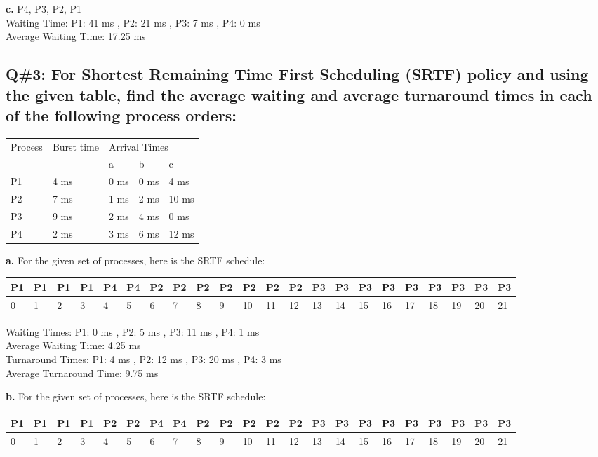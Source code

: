 \textbf{c.} P4, P3, P2, P1  \\
Waiting Time: P1: 41 ms , P2: 21 ms , P3: 7 ms , P4: 0 ms  \\
Average Waiting Time: 17.25 ms

\subsection*{Q\#3: For Shortest Remaining Time First Scheduling (SRTF) policy and using the given table, find the  
average waiting and average turnaround times in each of the following process orders:}

\begin{tabular}{lllll}
Process & Burst time & \multicolumn{3}{l}{Arrival Times} \\
& & a & b & c \\
P1 & 4 ms & 0 ms & 0 ms & 4 ms \\
P2 & 7 ms & 1 ms & 2 ms & 10 ms \\
P3 & 9 ms & 2 ms & 4 ms & 0 ms \\
P4 & 2 ms & 3 ms & 6 ms & 12 ms \\
\end{tabular}

\textbf{a.} For the given set of processes, here is the SRTF schedule:

\begin{table}[htbp]
\begin{tabularx}{\textwidth}{| X | X | X | X | X | X | X | X | X | X | X | X | X | X | X | X | X | X |X | X | X | X |}
\hline
P1&P1& P1 &P1 &P4 &P4 &P2 &P2 &P2 &P2 &P2 &P2 &P2 &P3 &P3 &P3 &P3 &P3 &P3 &P3 &P3 &P3\\
\hline
0 & 1 & 2 & 3 & 4 & 5 & 6 & 7 & 8 & 9 &10 &11 &12 &13 &14 &15 &16 &17 &18 &19 &20 &21\\
\hline
\end{tabularx}
\end{table}
Waiting Times: P1: 0 ms , P2: 5 ms , P3: 11 ms , P4: 1 ms  \\
Average Waiting Time: 4.25 ms  \\
Turnaround Times: P1: 4 ms , P2: 12 ms , P3: 20 ms , P4: 3 ms  \\
Average Turnaround Time: 9.75 ms

\textbf{b.} For the given set of processes, here is the SRTF schedule:

\begin{table}[htbp]
\begin{tabularx}{\textwidth}{| X | X | X | X | X | X | X | X | X | X | X | X | X | X | X | X | X | X |X | X | X | X |}
\hline
P1 & P1 & P1 & P1 & P2 & P2 & P4 & P4 & P2 & P2 & P2 & P2 & P2 & P3 & P3 & P3 & P3 & P3 & P3 & P3 & P3 & P3\\
\hline
0 & 1 & 2 & 3 & 4 & 5 & 6 & 7 & 8 & 9 &10 &11 &12 &13 &14 &15 &16 &17 &18 &19 &20 &21\\
\hline
\end{tabularx}
\end{table}

